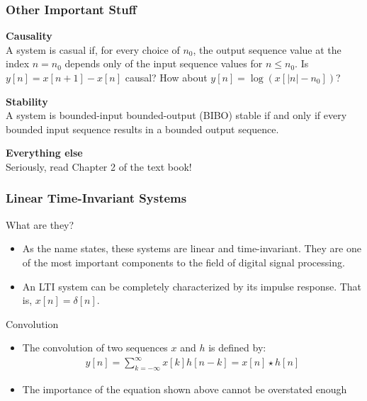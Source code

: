 \documentclass[mathserif,9pt,handout]{beamer}
\begin{document}
\begin{frame}\frametitle{Other Important Stuff}\small
  {\bf\color{blue!50!black}Causality} \\
  A system is casual if, for every choice of $n_0$, the output sequence value at the index $n=n_0$ depends only of the input sequence values for $n \leq n_0$. Is $y[n] = x[n+1] - x[n]$ causal? How about $y[n] = \log(x[|n| - n_0])$?\\
  \vspace{1em}
  
  {\bf\color{blue!50!black}Stability} \\
  A system is bounded-input bounded-output (BIBO) stable if and only if  every bounded input sequence results in a bounded output sequence. 
  \vspace{1em}
  
  {\bf\color{blue!50!black}Everything else} \\
  Seriously, read Chapter 2 of the text book!
\end{frame}


\begin{frame}\frametitle{Linear Time-Invariant Systems}\small
  \begin{block}{What are they?}
    \begin{itemize}
      \item As the name states, these systems are linear and time-invariant. They are one of the most important components to the field of digital signal processing. 
      \item An LTI system can be completely characterized by its impulse response. That is, $x[n] = \delta[n]$.
    \end{itemize}
  \end{block}
  
  \begin{exampleblock}{Convolution}
    \begin{itemize}
      \item The convolution of two sequences $x$ and $h$ is defined by:
        \begin{align}
          y[n] = \sum_{k=-\infty}^{\infty} x[k] h[n-k]  = x[n] \star h[n] \nonumber
        \end{align}
      \item The importance of the equation shown above cannot be overstated enough 
    \end{itemize}
  \end{exampleblock}
\end{frame}
\end{document}
